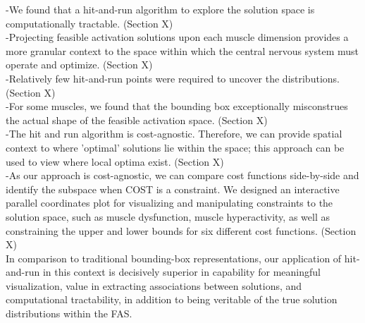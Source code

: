 -We found that a hit-and-run algorithm to explore the solution space is computationally tractable. (Section X)\\
-Projecting feasible activation solutions upon each muscle dimension provides a more granular context to the space within which the central nervous system must operate and optimize. (Section X)\\
-Relatively few hit-and-run points were required to uncover the distributions. (Section X)\\
-For some muscles, we found that the bounding box exceptionally misconstrues the actual shape of the feasible activation space. (Section X)\\
-The hit and run algorithm is cost-agnostic. Therefore, we can provide spatial context to where 'optimal' solutions lie within the space; this approach can be used to view where local optima exist. (Section X)\\
-As our approach is cost-agnostic, we can compare cost functions side-by-side and identify the subspace when COST is a constraint. We designed an interactive parallel coordinates plot for visualizing and manipulating constraints to the solution space, such as muscle dysfunction, muscle hyperactivity, as well as constraining the upper and lower bounds for six different cost functions. (Section X)\\

In comparison to traditional bounding-box representations, our application of hit-and-run in this context is decisively superior in capability for meaningful visualization, value in extracting associations between solutions, and computational tractability, in addition to being veritable of the true solution distributions within the FAS.
